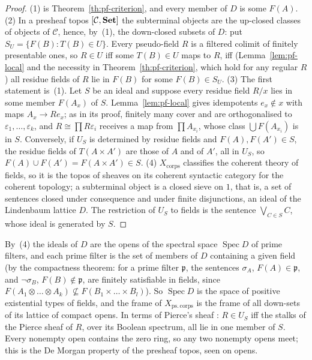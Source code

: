 \begin{proof}
(1) is Theorem~\ref{th:pf-criterion}, and every member of $D$ is some $F(A)$. (2) In a presheaf topos $[\mathcal C,\mathbf{Set}]$ the subterminal objects are the up-closed classes of objects of $\mathcal C$, hence, by~(1), the down-closed subsets of $D$: put $S_U = \{F(B) : T(B)\in U\}$. Every pseudo-field $R$ is a filtered colimit of finitely presentable ones, so $R\in U$ iff some $T(B)\in U$ maps to $R$, iff (Lemma~\ref{lem:pf-local} and the necessity in Theorem~\ref{th:pf-criterion}, which hold for any regular $R$) all residue fields of $R$ lie in $F(B)$ for some $F(B)\in S_U$. (3) The first statement is~(1). Let $S$ be an ideal and suppose every residue field $R/x$ lies in some member $F(A_x)$ of $S$. Lemma~\ref{lem:pf-local} gives idempotents $e_x\notin x$ with maps $A_x\to Re_x$; as in its proof, finitely many cover and are orthogonalised to $\varepsilon_1,\dots,\varepsilon_k$, and $R\cong\prod R\varepsilon_i$ receives a map from $\prod A_{x_i}$, whose class $\bigcup F(A_{x_i})$ is in $S$. Conversely, if $U_S$ is determined by residue fields and $F(A), F(A')\in S$, the residue fields of $T(A\times A')$ are those of $A$ and of $A'$, all in $U_S$, so $F(A)\cup F(A') = F(A\times A')\in S$. (4) $X_{\mathrm{corps}}$ classifies the coherent theory of fields, so it is the topos of sheaves on its coherent syntactic category for the coherent topology; a subterminal object is a closed sieve on $1$, that is, a set of sentences closed under consequence and under finite disjunctions, an ideal of the Lindenbaum lattice $D$. The restriction of $U_S$ to fields is the sentence $\bigvee_{C\in S}C$, whose ideal is generated by $S$.
\end{proof}

By~(4) the ideals of $D$ are the opens of the spectral space $\operatorname{Spec}D$ of prime filters, and each prime filter is the set of members of $D$ containing a given field (by the compactness theorem: for a prime filter $\mathfrak p$, the sentences $\sigma_A$, $F(A)\in\mathfrak p$, and $\neg\sigma_B$, $F(B)\notin\mathfrak p$, are finitely satisfiable in fields, since $F(A_1\otimes\dots\otimes A_k)\not\subseteq F(B_1\times\dots\times B_l)$). So $\operatorname{Spec}D$ is the space of positive existential types of fields, and the frame of $X_{\mathrm{ps.\,corps}}$ is the frame of all down-sets of its lattice of compact opens. In terms of Pierce's sheaf \cite{pierce}: $R\in U_S$ iff the stalks of the Pierce sheaf of $R$, over its Boolean spectrum, all lie in one member of $S$. Every nonempty open contains the zero ring, so any two nonempty opens meet; this is the De Morgan property of the presheaf topos, seen on opens.

